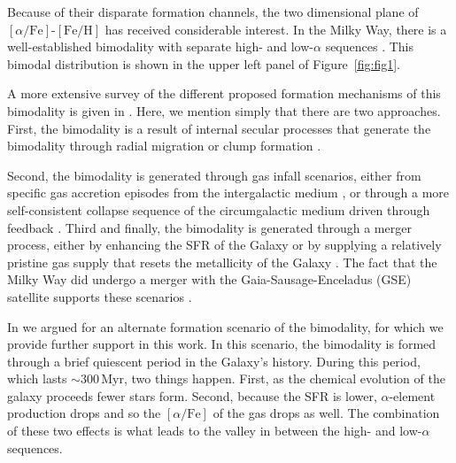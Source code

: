 \documentclass[linenumbers, twocolumn]{aastex631}
\newcommand{\Myr}{\ensuremath{\textrm{Myr}}}
\newcommand{\FeH}{\ensuremath{[\textrm{Fe}/\textrm{H}]}}
\newcommand{\alphaFe}{\ensuremath{[\alpha/\textrm{Fe}]}}
\begin{document}
Because of their disparate formation channels, the two dimensional plane of \alphaFe{}-\FeH{} has received considerable interest. In the Milky Way, there is a well-established bimodality with separate high- and low-$\alpha$ sequences \citep{1996ASPC...92..307G,1998A&A...338..161F,2004AN....325....3F,2006MNRAS.367.1329R,2011A&A...535L..11A,2012A&A...545A..32A,2014A&A...562A..71B,2014ApJ...796...38N,2020MNRAS.493.2952H}. This bimodal distribution is shown in the upper left panel of Figure~\ref{fig:fig1}.

A more extensive survey of the different proposed formation mechanisms of this bimodality is given in \citet{2024arXiv240707985B}. Here, we mention simply that there are two approaches. First, the bimodality is a result of internal secular processes that generate the bimodality through radial migration \citep{2009MNRAS.396..203S,2021MNRAS.507.5882S,2023MNRAS.523.3791C} or clump formation \citep{2019MNRAS.484.3476C,2020MNRAS.492.4716B,2021MNRAS.502..260B,2023ApJ...953..128G}.

Second, the bimodality is generated through gas infall scenarios, either from specific gas accretion episodes from the intergalactic medium \citep{1997ApJ...477..765C,2009IAUS..254..191C,2017MNRAS.472.3637G,2019A&A...623A..60S}, or through a more self-consistent collapse sequence of the circumgalactic medium driven through feedback \citep{2021MNRAS.501.5176K}. Third and finally, the bimodality is generated through a merger process, either by enhancing the SFR of the Galaxy \citep{2004ApJ...612..894B,2005ApJ...630..298B,2007ApJ...658...60B,2010MNRAS.402.1489R} or by supplying a relatively pristine gas supply that resets the metallicity of the Galaxy \citep{2020MNRAS.491.5435B,2024MNRAS.528L.122C}. The fact that the Milky Way did undergo a merger with the Gaia-Sausage-Enceladus (GSE) satellite supports these scenarios \citep{2018MNRAS.478..611B,2018Natur.563...85H,2020ApJ...901...48N}.

In \citet{2024arXiv240707985B} we argued for an alternate formation scenario of the bimodality, for which we provide further support in this work. In this scenario, the bimodality is formed through a brief quiescent period in the Galaxy's history. During this period, which lasts $\sim300\,\Myr$, two things happen. First, as the chemical evolution of the galaxy proceeds fewer stars form. Second, because the SFR is lower, $\alpha$-element production drops and so the \alphaFe{} of the gas drops as well. The combination of these two effects is what leads to the valley in between the high- and low-$\alpha$ sequences.
\end{document}
